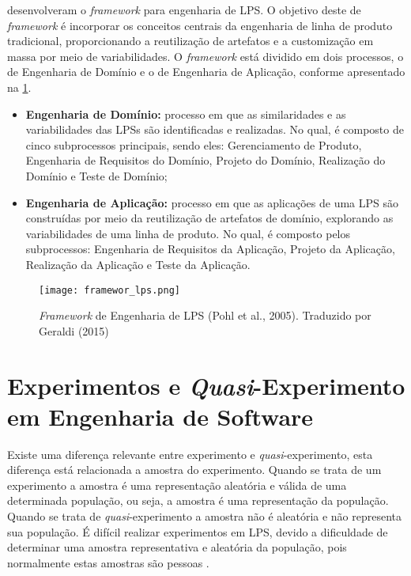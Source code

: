 \citeauthor*{pohl2005software} desenvolveram o \textit{framework} para engenharia de LPS. O objetivo deste de \textit{framework} é incorporar os conceitos centrais da engenharia de linha de produto tradicional, proporcionando a reutilização de artefatos e a customização em massa por meio de variabilidades. O \textit{framework} está dividido em dois processos, o de Engenharia de Domínio e o de Engenharia de Aplicação, conforme apresentado na \ref{fig:framework-lps}.

\begin{itemize}
	\item \textbf{Engenharia de Domínio:} processo em que as similaridades e as variabilidades das LPSs são identificadas e realizadas. No qual, é composto de cinco subprocessos principais, sendo eles: Gerenciamento de Produto, Engenharia de Requisitos do Domínio, Projeto do Domínio, Realização do Domínio e Teste de Domínio;

	\item \textbf{Engenharia de Aplicação:} processo em que as aplicações de uma LPS são construídas por meio da reutilização de artefatos de domínio, explorando as variabilidades de uma linha de produto. No qual, é composto pelos subprocessos: Engenharia de Requisitos da Aplicação, Projeto da Aplicação, Realização da Aplicação e Teste da Aplicação.
\end{itemize}

\begin{figure}[htb]
	\centering					
	{\texttt{[image: framewor\_lps.png]}}
	
	\caption{\textit{Framework} de Engenharia de LPS (Pohl et al., 2005). Traduzido por Geraldi (2015) }
	\label{fig:framework-lps}
\end{figure}


\section{Experimentos e \textit{Quasi}-Experimento em Engenharia de Software}
\label{sec:exp_eng_software}

Existe uma diferença relevante entre experimento e \textit{quasi}-experimento, esta diferença está relacionada a amostra do experimento. Quando se trata de um experimento a amostra é uma representação aleatória e válida de uma determinada população, ou seja, a amostra é uma representação da população. Quando se trata de \textit{quasi}-experimento a amostra não é aleatória e não representa sua população. É difícil realizar experimentos em LPS, devido a dificuldade de determinar uma amostra representativa e aleatória da população, pois normalmente estas amostras são pessoas \cite{wohlin2012experimentation}.

